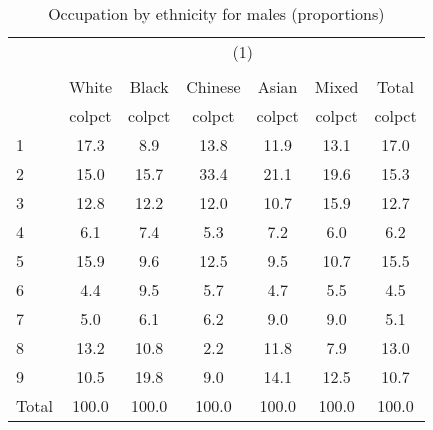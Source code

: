 \begin{table}[htbp]\centering
\def\sym#1{\ifmmode^{#1}\else\(^{#1}\)\fi}
\caption{Occupation by ethnicity for males (proportions)}
\begin{tabular}{l*{6}{c}}
\hline\hline
          &\multicolumn{6}{c}{(1)}                                    \\
          &\multicolumn{6}{c}{}                                       \\
          &    White&    Black&  Chinese&    Asian&    Mixed&    Total\\
          &   colpct&   colpct&   colpct&   colpct&   colpct&   colpct\\
\hline
1         &     17.3&      8.9&     13.8&     11.9&     13.1&     17.0\\
2         &     15.0&     15.7&     33.4&     21.1&     19.6&     15.3\\
3         &     12.8&     12.2&     12.0&     10.7&     15.9&     12.7\\
4         &      6.1&      7.4&      5.3&      7.2&      6.0&      6.2\\
5         &     15.9&      9.6&     12.5&      9.5&     10.7&     15.5\\
6         &      4.4&      9.5&      5.7&      4.7&      5.5&      4.5\\
7         &      5.0&      6.1&      6.2&      9.0&      9.0&      5.1\\
8         &     13.2&     10.8&      2.2&     11.8&      7.9&     13.0\\
9         &     10.5&     19.8&      9.0&     14.1&     12.5&     10.7\\
Total     &    100.0&    100.0&    100.0&    100.0&    100.0&    100.0\\
\hline\hline
\end{tabular}
\label{tab:occup_female}
\end{table}
